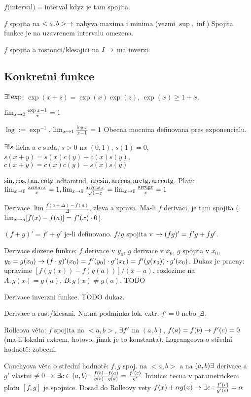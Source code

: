 $f($interval$)=$interval kdyz je tam spojita.

$f$ spojita na $<a,b>\rightarrow$ nabyva maxima i minima (vezmi $\sup,\inf$)
Spojita funkce je na uzavrenem intervalu omezena.

$f$ spojita a rostouci/klesajici na $I\rightarrow$ ma inverzi.

\subsection{Konkretni funkce}
$\exists!\exp$: $\exp(x+z)=\exp(x)\exp(z)$, $\exp(x)\geq 1+x$.

$\lim_{x\rightarrow 0}\frac{\exp x-1}{x}=1$

$\log:=\exp^{-1}$. $\lim_{x\rightarrow 1}\frac{\log x}{x-1}=1$
Obecna mocnina definovana pres exponencialu.

$\exists! s$ licha a $c$ suda,
$s>0$ na $(0,1)$, $s(1)=0$, $s(x+y)=s(x)c(y)+c(x)s(y)$,
$c(x+y)=c(x)c(y)-s(x)s(y)$

$\sin,\cos,\tan,\mathrm{cotg}$ odtamtud, $\arcsin,\arccos,\mathrm{arctg},\mathrm{arccotg}$.
Plati: $\lim_{x\rightarrow 0} \frac{\arcsin x}{x}=1,
	\lim_{x\rightarrow 0} \frac{\arccos x}{\sqrt{1-x}}=\lim_{x\rightarrow 0}\frac{\mathrm{arctg}
	x}{x}=1$

Derivace $\lim\frac{f(a+\Delta)-f(a)}{\Delta}$, zleva a zprava.
Ma-li $f$ derivaci, je tam spojita ($\lim_{x\rightarrow a}[f(x)-f(a)]=f'(x)\cdot 0$).

$(f+g)'=f'+g'$ je-li definovano. $f/g$ spojita v $\rightarrow (fg)'=f'g+fg'$.

Derivace slozene funkce: $f$ derivace v $y_0$, $g$ derivace v $x_0$,
$g$ spojita v $x_0$, $y_0=g(x_0) \rightarrow (f\cdot g)'(x_0)=f'(y_0)\cdot g'(x_0)=
f'(g(x_0))\cdot g'(x_0)$.
Dukaz je pracny: upravime $[f(g(x))-f(g(a))]/(x-a)$, rozlozime na $A:
g(x)=g(a)$, $B: g(x)\neq g(a)$. TODO

Derivace inverzni funkce. TODO dukaz.

Derivace a rust/klesani. Nutna podminka lok. extr: $f'=0$ nebo $\not\exists$.

Rolleova věta: $f$ spojita na $<a,b>$, $\exists f'$ na $(a,b)$, $f(a)=f(b)\rightarrow
f'(c)=0$ (ma-li lokalni extrem, hotovo, jinak je to konstanta).
Lagrangeova o střední hodnotě: zobecni.

Cauchyova věta o střední hodnotě: $f,g$ spoj. na $<a,b>$ a na $(a,b) \exists$
derivace a $g'$ vlastni $\neq 0\rightarrow$
$\exists c\in(a,b): \frac{f(b)-f(a)}{g(b)-g(a)}=\frac{f'(c)}{g'}$
Intuice: tecna v parametrickem plotu $[f,g]$ je spojnice.
Dosad do Rolleovy vety $f(x)+\alpha g(x)\rightarrow\exists c: \frac{f'(c)}{g'(c)}=\alpha$

